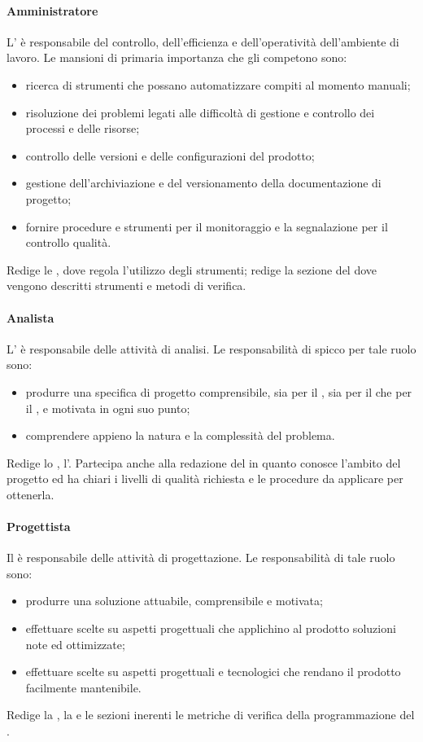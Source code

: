 \documentclass[12pt,a4paper]{article}
\begin{document}
\paragraph{Amministratore}
L'\AM{} è responsabile del controllo, dell'efficienza e dell'operatività dell'ambiente di lavoro. Le mansioni di primaria importanza che gli competono sono:
\begin{itemize}
	\item ricerca di strumenti che possano automatizzare compiti al momento manuali;
	\item risoluzione dei problemi legati alle difficoltà di gestione e controllo dei processi e delle risorse;
	\item controllo delle versioni e delle configurazioni del prodotto;
	\item gestione dell'archiviazione e del versionamento della documentazione di progetto;
	\item fornire procedure e strumenti per il monitoraggio e la segnalazione per il controllo qualità.
\end{itemize}
Redige le \NdP{}, dove regola l'utilizzo degli strumenti; redige la sezione del \PdQ{} dove vengono descritti strumenti e metodi di verifica.

\paragraph{Analista}
L'\AN{} è responsabile delle attività di analisi. Le responsabilità di spicco per tale ruolo sono:
\begin{itemize}
	\item produrre una specifica di progetto comprensibile, sia per il , sia per il  che per il \PG{}, e motivata in ogni suo punto;
	\item comprendere appieno la natura e la complessità del problema.
\end{itemize}
Redige lo \SdF{}, l'\AdR{}.
Partecipa anche alla redazione del \PdQ{} in quanto conosce l'ambito del progetto ed ha chiari i livelli di qualità richiesta e le procedure da applicare per ottenerla.

\paragraph{Progettista}
Il \PG{} è responsabile delle attività di progettazione. Le responsabilità di tale
ruolo sono:
\begin{itemize}
	\item produrre una soluzione attuabile, comprensibile e motivata;
	\item effettuare scelte su aspetti progettuali che applichino al prodotto soluzioni note ed ottimizzate;
	\item effettuare scelte su aspetti progettuali e tecnologici che rendano il prodotto facilmente mantenibile.
\end{itemize}
Redige la \ST{}, la \DP{} e le sezioni inerenti le metriche di verifica della programmazione del \PdQ{}.
\end{document}
